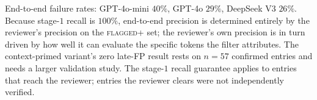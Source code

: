 End-to-end failure rates: GPT-4o-mini $40\%$, GPT-4o $29\%$,
DeepSeek V3 $26\%$. Because stage-$1$ recall is $100\%$, end-to-end
precision is determined entirely by the reviewer's precision on the
\textsc{flagged+} set; the reviewer's own precision is in turn
driven by how well it can evaluate the specific tokens the filter
attributes. The context-primed variant's zero late-FP result rests
on $n=57$ confirmed entries and needs a larger validation study.
The stage-$1$ recall guarantee applies to entries that reach the
reviewer; entries the reviewer clears were not independently verified.
